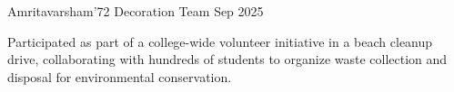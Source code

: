 \resumeProject
  {Amritavarsham'72}
  {Decoration Team}
  {Sep 2025}
  {{} }
\resumeItemListStart
  \item Participated as part of a college-wide volunteer initiative in a beach cleanup drive, collaborating with hundreds of students to organize waste collection and disposal for environmental conservation.
\resumeItemListEnd
